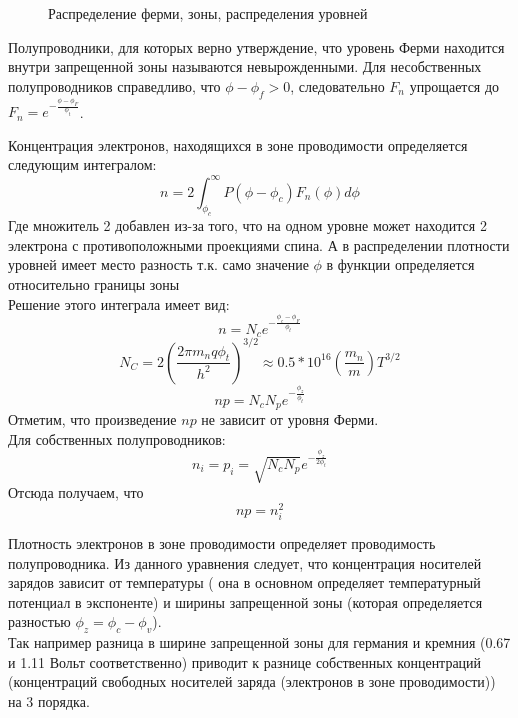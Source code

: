 \begin{center}
	\begin{figure}[H]
		\caption{Распределение ферми, зоны, распределения уровней}	
  		\label{img:fermi}
	\end{figure}
\end{center}	


Полупроводники, для которых верно утверждение, что уровень Ферми находится внутри запрещенной зоны называются невырожденными. Для несобственных полупроводников справедливо, что $\phi - \phi_f > 0$, следовательно $F_n$ упрощается до $F_n = e^{-\frac{\phi - \phi_F}{\phi_t}}$. 


Концентрация электронов, находящихся в зоне проводимости определяется следующим интегралом:
\begin{equation}
n = 2 \int_{\phi_c}^{\infty} P(\phi - \phi_c) F_n(\phi) d\phi
\end{equation}
Где множитель 2 добавлен из-за того, что на одном уровне может находится 2 электрона с противоположными проекциями спина. А в распределении плотности уровней имеет место разность т.к. само значение $\phi$ в функции определяется относительно границы зоны\\

Решение этого интеграла имеет вид:
\begin{equation}
n = N_c  e^{-\frac{\phi_c - \phi_F}{\phi_t}}
\end{equation}
\begin{equation}
N_C = 2 (\frac{2 \pi m_n q  \phi_t }{h^2})^{3/2} \approx 0.5 * 10^{16} (\frac{m_n}{m}) T^{3/2} 
\end{equation}
\begin{equation}
np = N_c N_p e^{-\frac{\phi_z}{\phi_t}}
\end{equation}
Отметим, что произведение $np$ не зависит от уровня Ферми.\\
Для собственных полупроводников:
\begin{equation}
n_i = p_i = \sqrt{N_c N_p} e^{-\frac{\phi_z}{2 \phi_t}}
\end{equation}
Отсюда получаем, что 
\begin{equation}
\label{eq:conc_ratio} np = n_i^2
\end{equation}

Плотность электронов в зоне проводимости определяет проводимость полупроводника.
Из данного уравнения следует, что концентрация носителей зарядов зависит от температуры ( она в основном определяет температурный потенциал в экспоненте) и ширины запрещенной зоны (которая определяется разностью $\phi_z = \phi_c - \phi_v$).  \\
Так например разница в ширине запрещенной зоны для германия и кремния (0.67 и 1.11 Вольт соответственно) приводит к разнице собственных концентраций (концентраций свободных носителей заряда (электронов в зоне проводимости)) на 3 порядка.

